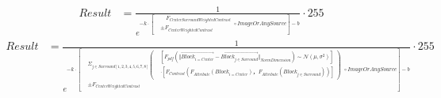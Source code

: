 \documentclass[a4paper]{article}
\begin{document}
\begin{align*}
    Result &=
    \frac{
        1
    }{
    e ^ 
    {
    -k \cdot
    \left[
    \begin{aligned}
        &\quad F_{CenterSurroundWeightedContrast}
        \\
        &\pm F_{CenterWeightedContrast} 
    \end{aligned}
    \circ ImageOrAnySource
    \right]
    - b
    }
}
\cdot 255
\end{align*}
\begin{align*}
    Result &=
    \frac{
        1
    }{
    e ^ 
    {
        -k \cdot
        \left[
        \begin{aligned}
            &\Sigma_{j \in Surround[1,2,3,4,5,6,7,8]}
            \left(
                \begin{aligned}
                    &\left[
                        F_{pdf}\left(
                            \Vert{
                                \overrightarrow{Block_{i=Center}}
                                - \overrightarrow{Block_{j \in Surround}}
                            }\Vert_{NormDimension}
                        \right) \sim \mathcal{N}(\mu, \sigma^{2})
                    \right]
                    \\
                    &\cdot
                    \left[
                        F_{Contrast}(F_{Attribute}(Block_{i =Center})， F_{Attribute}(Block_{j \in Surround}))
                    \right]
                \end{aligned}
            \right)
            \\
            &\pm F_{CenterWeightedContrast} 
        \end{aligned}
        \circ ImageOrAnySource
        \right]
        - b
        }
    }
    \cdot 255
\end{align*}
\end{document}
